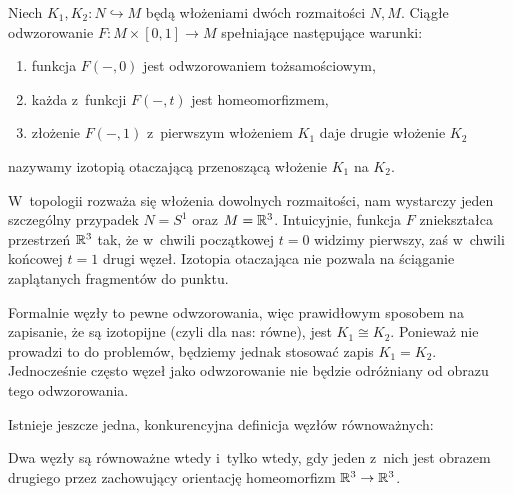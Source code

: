 \begin{definition}
%
    Niech $K_1, K_2 \colon N \hookrightarrow M$ będą włożeniami dwóch rozmaitości $N, M$.
    Ciągłe odwzorowanie $F \colon M \times [0,1] \to M$ spełniające następujące warunki:
    \begin{enumerate}
        \item funkcja $F(-, 0)$ jest odwzorowaniem tożsamościowym,
        \item każda z~funkcji $F(-, t)$ jest homeomorfizmem,
        \item złożenie $F(-, 1)$ z~pierwszym włożeniem $K_1$ daje drugie włożenie $K_2$
    \end{enumerate}
    nazywamy izotopią otaczającą przenoszącą włożenie $K_1$ na $K_2$.
\end{definition}

W~topologii rozważa się włożenia dowolnych rozmaitości, nam wystarczy jeden szczególny przypadek $N = S^1$ oraz $M = \mathbb R^3$.
Intuicyjnie, funkcja $F$ zniekształca przestrzeń $\mathbb R^3$ tak, że w~chwili początkowej $t = 0$ widzimy pierwszy, zaś w~chwili końcowej $t = 1$ drugi węzeł.
Izotopia otaczająca nie pozwala na ściąganie zaplątanych fragmentów do punktu.

Formalnie węzły to pewne odwzorowania, więc prawidłowym sposobem na zapisanie, że są izotopijne (czyli dla nas: równe), jest $K_1 \cong K_2$.
Ponieważ nie prowadzi to do problemów, będziemy jednak stosować zapis $K_1 = K_2$.
Jednocześnie często węzeł jako odwzorowanie nie będzie odróżniany od obrazu tego odwzorowania.

Istnieje jeszcze jedna, konkurencyjna definicja węzłów równoważnych:

\begin{proposition}
\label{def:equivalent_knots_2}%
    Dwa węzły są równoważne wtedy i~tylko wtedy, gdy jeden z~nich jest obrazem drugiego przez zachowujący orientację homeomorfizm $\mathbb R^3 \to \mathbb R^3$.
\end{proposition}

